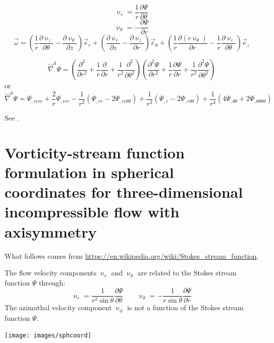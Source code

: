 \[
\upnu_r=\frac{1}{r}\frac{\partial \Psi}{\partial \theta} 
\]
\[
\upnu_\theta=-\frac{\partial \Psi}{\partial r} 
\]
\[
\vec \omega
=
\left( \frac{1}{r} \frac{\partial \upnu_z}{\partial \theta} -\frac{\partial \upnu_\theta}{\partial z}  \right) \vec{e}_r +
\left(  \frac{\partial \upnu_r}{\partial z}-\frac{\partial \upnu_z}{\partial r} \right) \vec{e}_\theta +
\left( \frac{1}{r}\frac{\partial (r \upnu_\theta)}{\partial r}-\frac{1}{r}\frac{\partial \upnu_r}{\partial \theta}  \right) \vec{e}_z 
\]

\[
\vec\nabla^4 \Psi= 
\left(
\frac{\partial^2}{\partial r^2}
+\frac{1}{r}\frac{\partial }{\partial r}
+\frac{1}{r^2}\frac{\partial^2 }{\partial \theta^2}
\right)
\left(
\frac{\partial^2 \Psi}{\partial r^2}
+\frac{1}{r}\frac{\partial \Psi}{\partial r}
+\frac{1}{r^2}\frac{\partial^2 \Psi}{\partial \theta^2}
\right)
\]
or
\[
\vec\nabla^4 \Psi= 
\Psi_{,rrrr}
+\frac{2}{r}\Psi_{,rrr}
-\frac{1}{r^2}(\Psi_{,rr}-2\Psi_{,rr\theta\theta})
+\frac{1}{r^3}(\Psi_{,r} -2\Psi_{,r\theta\theta})
+\frac{1}{r^4}(4\Psi_{,\theta\theta}+2\Psi_{,\theta\theta\theta\theta})
\]

See \textcite{hsui78}. \cite{tosl78} \cite{trol94}

\section{Vorticity-stream function formulation in spherical coordinates
for three-dimensional incompressible flow with axisymmetry}

What follows comes from \url{https://en.wikipedia.org/wiki/Stokes_stream_function}.

The flow velocity components $\upnu_r$ and $\upnu_\theta$ 
are related to the Stokes stream function $\Psi$ through:
\[
\upnu_r = \frac{1}{r^2 \sin \theta} \frac{\partial \Psi}{\partial \theta}
\qquad
\upnu_\theta = -\frac{1}{r \sin \theta} \frac{\partial \Psi}{\partial r}
\]
The azimuthal velocity component $\upnu_\phi$ is not a function of the Stokes stream function $\Psi$.

\begin{center}
\texttt{[image: images/sphcoord]}
\end{center}


